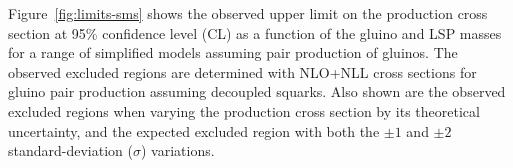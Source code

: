 Figure~\ref{fig:limits-sms} shows the observed upper limit on the
production cross section at 95\% confidence level (CL) as a function
of the gluino and LSP masses for
a range of simplified models assuming pair production of gluinos. 
%
%
%
The observed excluded regions are determined with NLO+NLL
cross sections for gluino pair production assuming decoupled squarks. Also shown are the
observed excluded regions when varying the production cross section by
its theoretical uncertainty, and the expected excluded region with
both the ${\pm}1$ and ${\pm}2$ standard-deviation ($\sigma$)
variations. 



